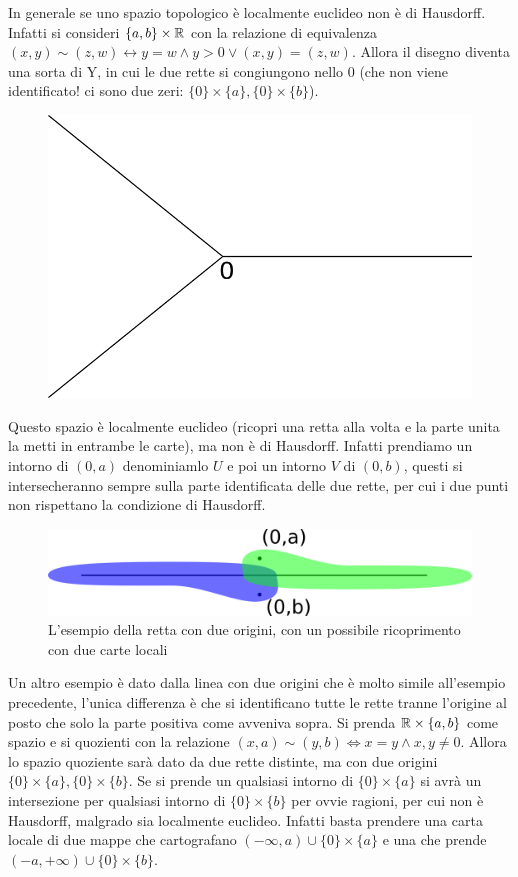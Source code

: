 \begin{remark}
	In generale se uno spazio topologico è localmente euclideo non è di Hausdorff. Infatti si consideri $\{a,b\} \times \mathbb{R}$ con la relazione di equivalenza $(x,y) \sim (z,w) \leftrightarrow y = w \land y > 0 \lor (x,y) = (z,w)$. Allora il disegno diventa una sorta di Y, in cui le due rette si congiungono nello $0$ (che non viene identificato! ci sono due zeri: $\{0\}\times \{a\}, \{0\}\times \{b\}$).
	\begin{figure}[H]
		\centering
		\includegraphics[width=0.35\linewidth]{images/topologia_generale/lcleucnott2}
		\caption{}
		\label{fig:lcleucnott2}
	\end{figure}
	
	Questo spazio è localmente euclideo (ricopri una retta alla volta e la parte unita la metti in entrambe le carte), ma non è di Hausdorff. Infatti prendiamo un intorno di $(0,a)$ denominiamlo $U$ e poi un intorno $V$ di $(0,b)$, questi si intersecheranno sempre sulla parte identificata delle due rette, per cui i due punti non rispettano la condizione di Hausdorff. 
	
	\begin{figure}[H]
		\centering
		\includegraphics[width=0.7\linewidth]{images/topologia_generale/bug_eye}
		\caption{L'esempio della retta con due origini, con un possibile ricoprimento con due carte locali}
		\label{fig:bugeye}
	\end{figure}
	
	Un altro esempio è dato dalla linea con due origini che è molto simile all'esempio precedente, l'unica differenza è che si identificano tutte le rette tranne l'origine al posto che solo la parte positiva come avveniva sopra. Si prenda $\mathbb{R} \times \{a,b\}$ come spazio e si quozienti con la relazione $(x,a) \sim (y,b) \Longleftrightarrow x = y \land x,y \neq 0$. Allora lo spazio quoziente sarà dato da due rette distinte, ma con due origini $\{0\} \times \{a\}, \{0\}\times \{b\}$. Se si prende un qualsiasi intorno di $\{0\}\times \{a\}$ si avrà un intersezione per qualsiasi intorno di $\{0\} \times \{b\}$ per ovvie ragioni, per cui non è Hausdorff, malgrado sia localmente euclideo. Infatti basta prendere una carta locale di due mappe che cartografano $(-\infty, a) \cup \{0\}\times \{a\}$ e una che prende $(-a, +\infty) \cup \{0\}\times \{b\}$.  
\end{remark}

